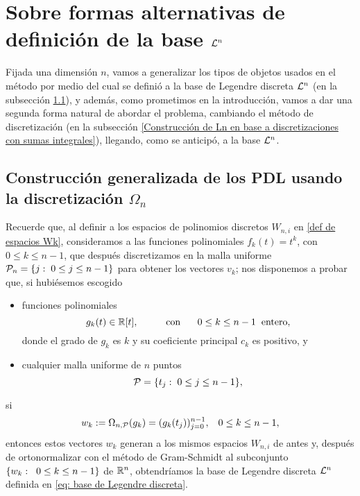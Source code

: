 \section{Sobre formas alternativas de definición de la base $\mathcal{L}^{n}$}

Fijada una dimensión $n$,
vamos a generalizar los tipos de objetos
usados
en el método por medio del cual
se definió a la base de Legendre discreta $\mathcal{L}^{n}$
(en la subsección 
\ref{Generalización que involucra a la discretización Omega n}),
y además, como prometimos en la introducción,
vamos a dar una segunda forma natural
de abordar el problema, cambiando el método de 
discretización
(en la subsección 
\ref{Construcción de Ln en base a discretizaciones con sumas integrales}),
llegando, como se anticipó, a la base
$\mathcal{L}^{n}$.

\subsection{Construcción generalizada de los PDL usando la discretización $\Omega_{n}$}
\label{Generalización que involucra a la discretización Omega n}

Recuerde que, al definir a los espacios
de polinomios discretos
$W_{n,i}$ en \eqref{def de espacios Wk},
consideramos a
las funciones polinomiales 
$f_{k}(t)=t^{k}$, con $0 \leq k \leq n-1$, que después
discretizamos en la malla uniforme
$\mathcal{P}_{n}= \{ j: \hspace{0.1cm} 0 \leq j \leq n-1 \} $
para obtener los vectores $v_{k}$; nos
disponemos a probar que, si hubiésemos escogido
\begin{itemize}
\item funciones polinomiales
\[
g_{k}(t) \in \mathbb{R}[t], \hspace{1cm} 
\text{con }\hspace{0.5cm} 0 \leq k \leq n-1 \hspace{0.2cm} \text{entero},
\]
donde
el grado de $g_{k}$ es $k$ y su coeficiente principal 
$c_{k}$ es positivo, y

\item cualquier malla uniforme de $n$ puntos
\[
\mathcal{P}=\{t_{j} : \hspace{0.1cm} 0 \leq j \leq n-1 \},
\]
\end{itemize}
si 
\begin{equation}
\label{eq1: 31Oct}
w_{k} := \Omega_{n,\mathcal{P}}(g_{k})
=(g_{k}(t_{j}))_{j=0}^{n-1}, \hspace{0.3cm} 0 \leq k \leq n-1,
\end{equation}
entonces estos vectores $w_{k}$
generan a los mismos espacios $W_{n,i}$
de antes y,
después de ortonormalizar con el 
método de Gram-Schmidt
al subconjunto $\{w_{k}: \hspace{0.2cm} 0 \leq k \leq n-1\}$
de $\mathbb{R}^{n}$, obtendríamos la 
base de Legendre discreta $\mathcal{L}^{n}$ 
definida en \eqref{eq: base de Legendre discreta}. 


